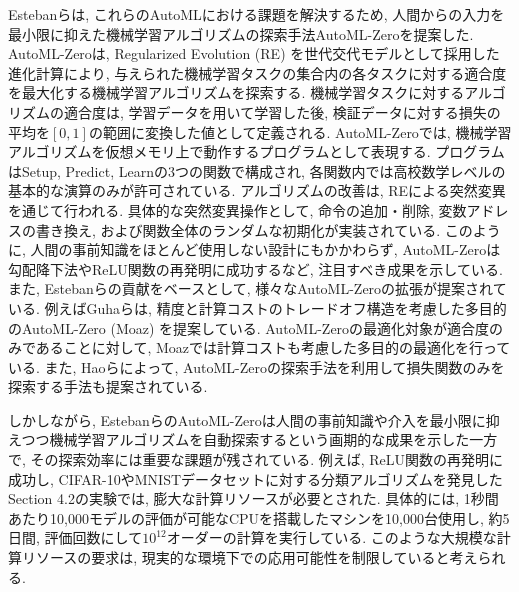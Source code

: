 \documentclass[11pt,oneside,openany,report]{jsbook}
\begin{document}
Estebanらは, これらのAutoMLにおける課題を解決するため, 人間からの入力を最小限に抑えた機械学習アルゴリズムの探索手法AutoML-Zeroを提案した\cite{automl_zero}. AutoML-Zeroは, Regularized Evolution (RE) を世代交代モデルとして採用した進化計算により, 与えられた機械学習タスクの集合内の各タスクに対する適合度を最大化する機械学習アルゴリズムを探索する. 機械学習タスクに対するアルゴリズムの適合度は, 学習データを用いて学習した後, 検証データに対する損失の平均を$[0,1]$の範囲に変換した値として定義される. AutoML-Zeroでは, 機械学習アルゴリズムを仮想メモリ上で動作するプログラムとして表現する. プログラムはSetup, Predict, Learnの3つの関数で構成され, 各関数内では高校数学レベルの基本的な演算のみが許可されている. アルゴリズムの改善は, REによる突然変異を通じて行われる. 具体的な突然変異操作として, 命令の追加・削除, 変数アドレスの書き換え, および関数全体のランダムな初期化が実装されている. このように, 人間の事前知識をほとんど使用しない設計にもかかわらず, AutoML-Zeroは勾配降下法やReLU関数の再発明に成功するなど, 注目すべき成果を示している\cite{automl_zero}. また, Estebanらの貢献をベースとして, 様々なAutoML-Zeroの拡張が提案されている. 例えばGuhaらは, 精度と計算コストのトレードオフ構造を考慮した多目的のAutoML-Zero (Moaz) を提案している\cite{multi_objective_automl_zero}. AutoML-Zeroの最適化対象が適合度のみであることに対して, Moazでは計算コストも考慮した多目的の最適化を行っている. また, Haoらによって, AutoML-Zeroの探索手法を利用して損失関数のみを探索する手法も提案されている\cite{auto_loss_zero}.

しかしながら, EstebanらのAutoML-Zeroは人間の事前知識や介入を最小限に抑えつつ機械学習アルゴリズムを自動探索するという画期的な成果を示した一方で, その探索効率には重要な課題が残されている. 例えば, ReLU関数の再発明に成功し, CIFAR-10やMNISTデータセットに対する分類アルゴリズムを発見したSection 4.2の実験では, 膨大な計算リソースが必要とされた. 具体的には, 1秒間あたり10,000モデルの評価が可能なCPUを搭載したマシンを10,000台使用し, 約5日間, 評価回数にして$10^{12}$オーダーの計算を実行している. このような大規模な計算リソースの要求は, 現実的な環境下での応用可能性を制限していると考えられる.
\end{document}
